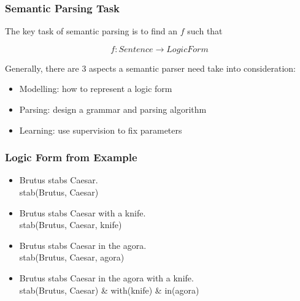 \documentclass{beamer}
\begin{document}
\begin{frame}
    \frametitle{Semantic Parsing Task}

    The key task of semantic parsing is to find an $f$ such that

    \[
        f: Sentence \to LogicForm
    \]

    \pause

    Generally, there are 3 aspects a semantic parser need take into consideration:

    \begin{itemize}
        \item Modelling: how to represent a logic form
        \item Parsing: design a grammar and parsing algorithm
        \item Learning: use supervision to fix parameters
    \end{itemize}

\end{frame}

\begin{frame}
    \frametitle{Logic Form from Example}

    \begin{itemize}

        \item <2->
            Brutus stabs Caesar. \\
            stab(Brutus, Caesar) 

        \item <3->
            Brutus stabs Caesar with a knife. \\
            stab(Brutus, Caesar, \alert{knife}) 

        \item <4->
            Brutus stabs Caesar in the agora. \\
            stab(Brutus, Caesar, \alert{agora}) 

        \item <5->
            Brutus stabs Caesar in the agora with a knife. \\
            stab(Brutus, Caesar) \& \alert{with}(knife) \& \alert{in}(agora)

    \end{itemize}

\end{frame}
\end{document}
